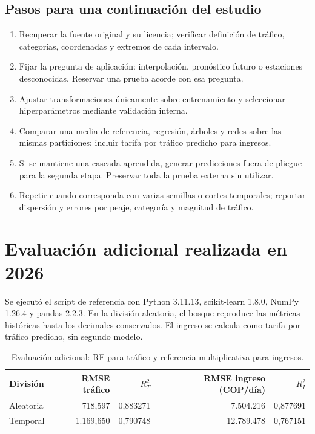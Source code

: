 \documentclass[11pt,a4paper]{article}
\begin{document}
\subsection{Pasos para una continuación del estudio}
\begin{enumerate}
\item Recuperar la fuente original y su licencia; verificar definición de tráfico, categorías, coordenadas y extremos de cada intervalo.
\item Fijar la pregunta de aplicación: interpolación, pronóstico futuro o estaciones desconocidas. Reservar una prueba acorde con esa pregunta.
\item Ajustar transformaciones únicamente sobre entrenamiento y seleccionar hiperparámetros mediante validación interna.
\item Comparar una media de referencia, regresión, árboles y redes sobre las mismas particiones; incluir tarifa por tráfico predicho para ingresos.
\item Si se mantiene una cascada aprendida, generar predicciones fuera de pliegue para la segunda etapa. Preservar toda la prueba externa sin utilizar.
\item Repetir cuando corresponda con varias semillas o cortes temporales; reportar dispersión y errores por peaje, categoría y magnitud de tráfico.
\end{enumerate}

\section{Evaluación adicional realizada en 2026}
Se ejecutó el script de referencia con Python 3.11.13, scikit-learn 1.8.0, NumPy 1.26.4 y pandas 2.2.3. En la división aleatoria, el bosque reproduce las métricas históricas hasta los decimales conservados. El ingreso se calcula como tarifa por tráfico predicho, sin segundo modelo.

\begin{table}[ht]\centering\small
\caption{Evaluación adicional: RF para tráfico y referencia multiplicativa para ingresos.}
\begin{tabular}{lrrrr}\toprule
División & RMSE tráfico & $R^2_T$ & RMSE ingreso (COP/día) & $R^2_I$\\\midrule
Aleatoria & 718,597 & 0,883271 & 7.504.216 & 0,877691\\
Temporal & 1.169,650 & 0,790748 & 12.789.478 & 0,767151\\\bottomrule
\end{tabular}\end{table}
\end{document}
